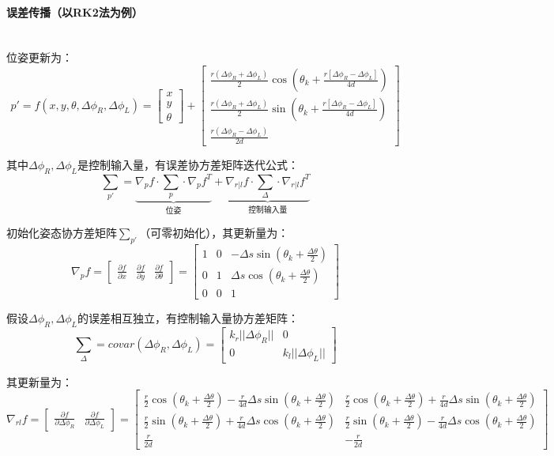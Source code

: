 \documentclass[
12pt, %
a4paper, 
oneside, %
headinclude,footinclude, %
]{scrartcl}
\begin{document}
\paragraph{误差传播（以RK2法为例）}\label{sec:error back}~\\

位姿更新为：
$$ p' = f(x, y, \theta, \Delta \phi_R, \Delta \phi_L) = \begin{bmatrix} x \\ y \\ \theta \end{bmatrix} + \begin{bmatrix} \frac{r(\Delta \phi_R + \Delta \phi_L)}{2} \cos(\theta_k + \frac{r[\Delta \phi_R - \Delta \phi_L]}{4d}) \\ \frac{r(\Delta \phi_R + \Delta \phi_L)}{2} \sin(\theta_k + \frac{r[\Delta \phi_R - \Delta \phi_L]}{4d}) \\ \frac{r(\Delta \phi_R - \Delta \phi_L)}{2d} \end{bmatrix} $$

其中$ \Delta \phi_R, \Delta \phi_L $是控制输入量，有误差协方差矩阵迭代公式：
$$ \sum_{p'} = \underbrace{\nabla_p f \cdot \sum_p \cdot \nabla_p f^T}_{\text{位姿}} + \underbrace{\nabla_{r|l}f \cdot \sum_{\Delta} \cdot \nabla_{r|l}f^T}_{\text{控制输入量}} $$

初始化姿态协方差矩阵$ \sum_{p'} $（可零初始化），其更新量为：
$$ \nabla_p f = \begin{bmatrix}\frac{\partial f}{\partial x} & \frac{\partial f}{\partial y} & \frac{\partial f}{\partial \theta}\end{bmatrix} = \begin{bmatrix} 1 & 0 & -\Delta s \sin(\theta_k + \frac{\Delta \theta}{2}) \\ 0 & 1 & \Delta s \cos(\theta_k + \frac{\Delta \theta}{2}) \\ 0 & 0 & 1 \end{bmatrix} $$

假设$ \Delta \phi_R, \Delta \phi_L $的误差相互独立，有控制输入量协方差矩阵：
$$ \sum_{\Delta} = covar(\Delta \phi_R, \Delta \phi_L) = \begin{bmatrix} k_r||\Delta \phi_R|| & 0 \\ 0 & k_l||\Delta \phi_L|| \end{bmatrix} $$

其更新量为：
$$ \nabla_{rl}f = \begin{bmatrix} \frac{\partial f}{\partial \Delta \phi_R} & \frac{\partial f}{\partial \Delta \phi_L} \end{bmatrix} = \begin{bmatrix} \frac{r}{2}\cos(\theta_k + \frac{\Delta \theta}{2}) - \frac{r}{4d}\Delta s \sin(\theta_k + \frac{\Delta \theta}{2}) & \frac{r}{2}\cos(\theta_k + \frac{\Delta \theta}{2}) + \frac{r}{4d}\Delta s \sin(\theta_k + \frac{\Delta \theta}{2}) \\ \frac{r}{2}\sin(\theta_k + \frac{\Delta \theta}{2}) + \frac{r}{4d}\Delta s \cos(\theta_k + \frac{\Delta \theta}{2}) & \frac{r}{2}\sin(\theta_k + \frac{\Delta \theta}{2}) - \frac{r}{4d}\Delta s \cos(\theta_k + \frac{\Delta \theta}{2}) \\ \frac{r}{2d} & -\frac{r}{2d} \end{bmatrix} $$
\end{document}
